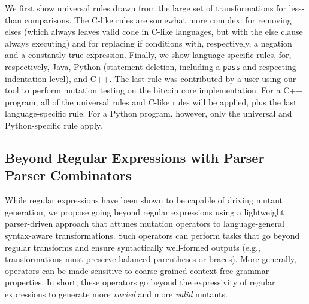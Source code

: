 \documentclass[acmsmall,screen,review,anonymous]{acmart}
\begin{document}
{We first show universal rules drawn from the large set of transformations for
less-than comparisons.  The C-like rules are somewhat more
complex: for removing elses (which always leaves valid code in
C-like languages, but with the else clause always executing) and for
replacing if conditions with, respectively, a negation and a
constantly true expression.  Finally, we show
language-specific rules, for, respectively, Java, Python (statement
deletion, including a {\tt pass} and respecting indentation level),
and C++.  The last rule was contributed by a user using our tool to
perform mutation testing on the bitcoin core implementation.  For a
C++ program, all of the universal rules and C-like rules will be
applied, plus the last language-specific rule.  For a Python
program, however, only the universal and Python-specific rule apply.


\subsection{Beyond Regular Expressions with Parser Parser Combinators}




While regular expressions have been shown to be capable of driving mutant generation, we
propose going beyond regular expressions using a lightweight
parser-driven approach that attunes mutation operators to
language-general syntax-aware transformations. Such operators can
perform tasks that go beyond regular transforms and ensure
syntactically well-formed outputs (e.g., transformations must preserve
balanced parentheses or braces). More generally, operators can be made
sensitive to coarse-grained context-free grammar properties. In short,
these
operators go beyond the expressivity of regular expressions to generate more
\emph{varied} and more \emph{valid} mutants.

}
\end{document}
